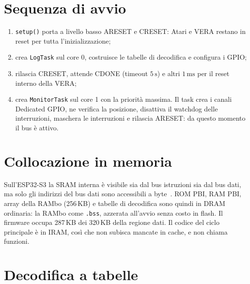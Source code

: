 \documentclass[11pt,a4paper,twoside,openright]{report}
\DeclareRobustCommand{\code}[1]{\begingroup\renewcommand{\_}{\textunderscore\allowbreak}\texttt{#1}\endgroup}
\newcommand{\sig}[1]{\textsf{#1}}
\begin{document}
\section{Sequenza di avvio}

\begin{enumerate}
  \item \code{setup()} porta a livello basso \sig{ARESET} e \sig{CRESET}: Atari e VERA
        restano in reset per tutta l'inizializzazione;
  \item crea \code{LogTask} sul core 0, costruisce le tabelle di decodifica e configura i
        GPIO;
  \item rilascia \sig{CRESET}, attende \sig{CDONE} (timeout $5\,\mathrm{s}$) e altri
        $1\,\mathrm{ms}$ per il reset interno della VERA;
  \item crea \code{MonitorTask} sul core 1 con la priorità massima. Il task crea i canali
        Dedicated GPIO, ne verifica la posizione, disattiva il watchdog delle interruzioni,
        maschera le interruzioni e rilascia \sig{ARESET}: da questo momento il bus è attivo.
\end{enumerate}

\section{Collocazione in memoria}

Sull'ESP32-S3 la SRAM interna è visibile sia dal bus istruzioni sia dal bus dati, ma solo
gli indirizzi del bus dati sono accessibili a byte~\cite{idfdedic}. ROM PBI, RAM PBI, array
della RAMbo (256\,KB) e tabelle di decodifica sono quindi in DRAM ordinaria: la RAMbo come
\code{.bss}, azzerata all'avvio senza costo in flash. Il firmware occupa 287\,KB dei
320\,KB della regione dati. Il codice del ciclo principale è in IRAM, così che non subisca
mancate in cache, e non chiama funzioni.

\section{Decodifica a tabelle}
\end{document}
